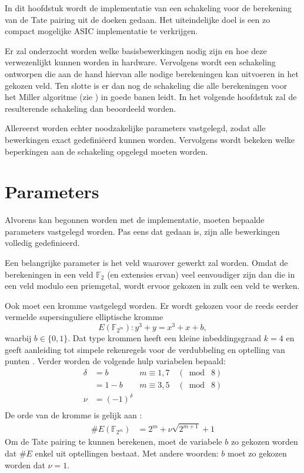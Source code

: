 
In dit hoofdstuk wordt de implementatie van een schakeling voor de berekening van de Tate pairing uit de doeken gedaan. Het uiteindelijke doel is een zo compact mogelijke  ASIC implementatie te verkrijgen.

Er zal onderzocht worden welke basisbewerkingen nodig zijn en hoe deze verwezenlijkt kunnen worden in hardware. Vervolgens wordt een schakeling ontworpen die aan de hand hiervan alle nodige berekeningen kan uitvoeren in het gekozen veld. Ten slotte is er dan nog de schakeling die alle berekeningen voor het Miller algoritme (zie ) in goede banen leidt. In het volgende hoofdstuk zal de resulterende schakeling dan beoordeeld worden.

Allereerst worden echter noodzakelijke parameters vastgelegd, zodat alle bewerkingen exact gedefini\"eerd kunnen worden. Vervolgens wordt bekeken welke beperkingen aan de schakeling opgelegd moeten worden.

\section{Parameters\label{sectie-implementatie-parameters}}

Alvorens kan begonnen worden met de implementatie, moeten bepaalde parameters vastgelegd worden. Pas eens dat gedaan is, zijn alle bewerkingen volledig gedefinieerd.

Een belangrijke parameter is het veld waarover gewerkt zal worden. Omdat de berekeningen in een veld $\mathbb{F}_2$ (en extensies ervan) veel eenvoudiger zijn dan die in een veld modulo een priemgetal, wordt ervoor gekozen in zulk een veld te werken.

Ook moet een kromme vastgelegd worden. Er wordt gekozen voor de reeds eerder vermelde supersinguliere elliptische kromme
\[E(\mathbb{F}_{2^m}): y^3 + y = x^3 + x + b,\]
waarbij $b \in \{0, 1\}$.  Dat type krommen heeft een kleine inbeddingsgraad $k = 4$ en geeft aanleiding tot simpele rekenregels voor de verdubbeling en optelling van punten \cite{barreto-efficient, hankerson-book}. Verder worden de volgende hulp variabelen bepaald:
\[\begin{aligned}
\delta	&= b	\qquad	& m \equiv 1, 7 \quad(\bmod \; 8)\\
			&= 1 - b		& m \equiv 3, 5 \quad(\bmod \; 8)\\
\nu		&= (-1)^{\delta}\\
\end{aligned}\]
De orde van de kromme is gelijk aan \cite{bertoni, beuchat}:
\[\begin{aligned}
\#E(\mathbb{F}_{2^m})	&= 2^m + \nu \sqrt{2^{m + 1}} + 1
\end{aligned}\]
Om de Tate pairing te kunnen berekenen, moet de variabele $b$ zo gekozen worden dat $\#E$ enkel uit optellingen bestaat. Met andere woorden: $b$ moet zo gekozen worden dat $\nu = 1$.


